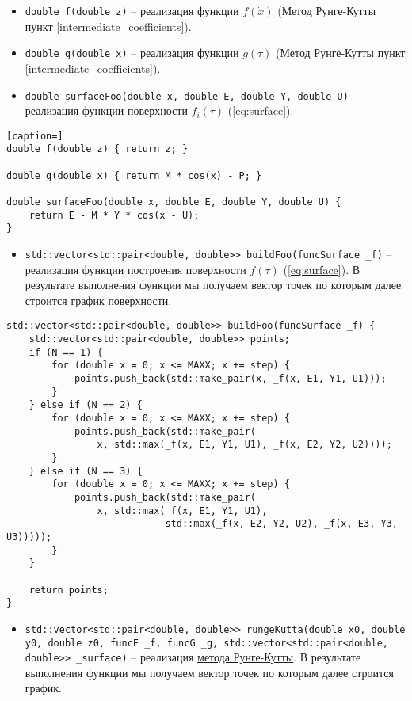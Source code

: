 \begin{enumerate}
\begin{itemize}
\item \texttt{double f(double z)} -- реализация функции $f(\dot x)$ (Метод Рунге-Кутты пункт \ref{intermediate_coefficients}).
\item \texttt{double g(double x)} -- реализация функции $g(\tau)$ (Метод Рунге-Кутты пункт \ref{intermediate_coefficients}).
\item \texttt{double surfaceFoo(double x, double E, double Y, double U)} -- реализация функции поверхности $f_i(\tau)$ (\ref{eq:surface}).
\end{itemize}

\begin{lstlisting}[caption=]
double f(double z) { return z; }

double g(double x) { return M * cos(x) - P; }

double surfaceFoo(double x, double E, double Y, double U) {
    return E - M * Y * cos(x - U);
}
\end{lstlisting}

\begin{itemize}
\item \lstinline`std::vector<std::pair<double, double>> buildFoo(funcSurface _f)` -- реализация функции построения поверхности $f(\tau)$ (\ref{eq:surface}). В результате выполнения функции мы получаем вектор точек по которым далее строится график поверхности.
\end{itemize}

\begin{lstlisting}
std::vector<std::pair<double, double>> buildFoo(funcSurface _f) {
    std::vector<std::pair<double, double>> points;
    if (N == 1) {
        for (double x = 0; x <= MAXX; x += step) {
            points.push_back(std::make_pair(x, _f(x, E1, Y1, U1)));
        }
    } else if (N == 2) {
        for (double x = 0; x <= MAXX; x += step) {
            points.push_back(std::make_pair(
                x, std::max(_f(x, E1, Y1, U1), _f(x, E2, Y2, U2))));
        }
    } else if (N == 3) {
        for (double x = 0; x <= MAXX; x += step) {
            points.push_back(std::make_pair(
                x, std::max(_f(x, E1, Y1, U1),
                            std::max(_f(x, E2, Y2, U2), _f(x, E3, Y3, U3)))));
        }
    }

    return points;
}
\end{lstlisting}

\begin{itemize}
\item \lstinline`std::vector<std::pair<double, double>> rungeKutta(double x0, double y0, double z0, funcF _f, funcG _g, std::vector<std::pair<double, double>> _surface)` -- реализация \hyperref[RKmathod]{метода Рунге-Кутты}. В результате выполнения функции мы получаем вектор точек по которым далее строится график.
\end{itemize}


\end{enumerate}
